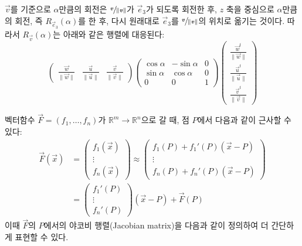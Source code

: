\documentclass[sections/engineering_mathematics_lecture_note.tex]{subfiles}
\begin{document}
\begin{remark}
    $\vec v$를 기준으로 $\alpha$만큼의 회전은 $\sfrac{\bm{\mathit{v}}}{\lVert \bm{\mathit{v}}\rVert}$가 $\vec e_3$가 되도록 회전한 후, $z$ 축을 중심으로 $\alpha$만큼의 회전, 즉 $R_{\vec e_3}(\alpha)$를 한 후, 다시 원래대로 $\vec e_3$를 $\sfrac{\bm{\mathit{v}}}{\lVert \bm{\mathit{v}}\rVert}$의 위치로 옮기는 것이다.
    따라서 $R_{\vec v}(\alpha)$는 아래와 같은 행렬에 대응된다:
    \begin{equation*}
        \begin{pmatrix}
            \frac{\vec w}{\lVert \vec w \rVert} & \frac{\vec u}{\lVert \vec u \rVert} & \frac{\vec v}{\lVert \vec v \rVert}
        \end{pmatrix}
        \begin{pmatrix}
            \cos \alpha & -\sin \alpha & 0\\
            \sin \alpha & \cos \alpha & 0\\
            0 & 0 & 1
        \end{pmatrix}
        \begin{pmatrix}
            \frac{\vec w^t}{\lVert \vec w \rVert} \\ \frac{\vec u^t}{\lVert \vec u \rVert} \\ \frac{\vec v^t}{\lVert \vec v \rVert}
        \end{pmatrix}
    \end{equation*}
\end{remark}

벡터함수 $\vec F = (f_1, \dots, f_n)$가 $\mathbb R^m \rightarrow \mathbb R^n$으로 갈 때, 점 $P$에서 다음과 같이 근사할 수 있다:
\begin{align*}
    \vec F(\vec x) &=
    \begin{pmatrix}
        f_1(\vec x) \\ \vdots \\ f_n(\vec x)
    \end{pmatrix}
    \approx
    \begin{pmatrix}
        f_1(P) + f_1'(P) (\vec x - P)\\
        \vdots\\
        f_n(P) + f_n'(P) (\vec x - P)
    \end{pmatrix}\\
              &=
              \begin{pmatrix}
                  f_1'(P) \\ \vdots \\ f_n'(P)
              \end{pmatrix}
              (\vec x - P) + \vec F(P)
\end{align*}
이때 $\vec F$의 $P$에서의 야코비 행렬(Jacobian matrix)을 다음과 같이 정의하여 더 간단하게 표현할 수 있다.
\end{document}
